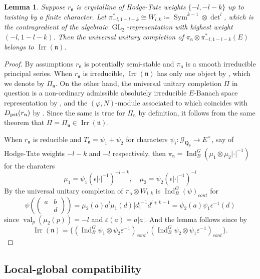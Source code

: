 \documentclass[leqno]{amsart}
\newtheorem{lem}[thm]{Lemma}
\theoremstyle{definition}
\theoremstyle{remark}
\newcommand{\Qp}{\mathbf{Q}_p}
\DeclareMathOperator{\Ind}{Ind}
\DeclareMathOperator{\Sym}{Sym}
\DeclareMathOperator{\GL}{GL}
\DeclareMathOperator{\val}{val} %
\newcommand{\pst}{\textnormal{pst}}
\newcommand{\fn}{\mathfrak{n}}
\DeclareMathOperator{\Irr}{Irr}
\newcommand{\Gp}{\mathcal{G}_{\Qp}} %
\begin{document}
\begin{lem}\label{lem:uni_completion}
	Suppose $r_\fn$ is crystalline of
	Hodge-Tate weights $\{-l,-l-k\}$
    up to twisting by a finite character.
    Let $\pi_{-l,1-l-k}^*\cong W_{l,k}\coloneqq
    \Sym^{k-1}\otimes\det^l$, which is the contragredient of
    the algebraic $\GL_2$-representation
    with highest weight $(-l,1-l-k)$.
	Then the universal unitary completion of 
	$\pi_\fn\otimes \pi_{-l,1-l-k}^*(E)$ belongs to 
	$\Irr(\fn)$.
\end{lem}
\begin{proof}
    By assumptions $r_{\fn}$ is potentially semi-stable and
    $\pi_{\fn}$ is a smooth irreducible principal series.
    When $r_\fn$ is irreducible, $\Irr(\fn)$
    has only one object by \cite[Cor 8.14]{pask},
    which we denote by $\Pi_{\fn}$.
    On the other hand,
    the universal unitary completion $\Pi$ in question
    is a non-ordinary admissible absolutely 
    irreducible $E$-Banach space representation
    by \cite[Thm 12.3]{pask},
    and the $(\varphi,N)$-module
    associated to which
    coincides with $D_{\pst}(r_\fn)$
    by \cite[Thm. 1.3]{CDP}.
    Since the same is true for $\Pi_{\fn}$
    by definition,
    it follows from the same theorem
    that $\Pi=\Pi_{\fn}\in \Irr(\fn)$.

	When  $r_\fn$ is reducible
	and $T_\fn=\psi_1+\psi_2$
	for characters
	$\psi_i\colon \Gp\to E^\times$,
	say of Hodge-Tate weights
	$-l-k$ and  $-l$ respectively,
	then $\pi_\fn=\Ind_B^G(\mu_1\otimes\mu_2|\cdot|^{-1})$
	for the charaters
	\[
	\mu_1=\psi_1(\epsilon|\cdot|^{-1})^{-l-k},\quad
	\mu_2=\psi_2(\epsilon|\cdot|^{-1})^{-l}	
	\]
	By \cite[Thm 12.3]{pask} the universal unitary completion
	of $\pi_\fn\otimes W_{l,k}$
	is $\Ind_B^G(\psi)_{cont}$ for
	\[
		\psi( (\begin{smallmatrix}
			a&b\\&d
		\end{smallmatrix}))
		=\mu_2(a)a^l\mu_1(d)|d|^{-1}d^{l+k-1}
		=\psi_2(a)\psi_1\epsilon^{-1}(d)
	\]
	since $\val_p(\mu_2(p))=-l$ and $\varepsilon(a)=a|a|$.
    And the lemma follows since
	by \cite[Cor 8.15]{pask}
	\[
	\Irr(\fn)=\{(\Ind_B^G\psi_1\otimes\psi_2\varepsilon^{-1})_{cont},
	(\Ind_B^G\psi_2\otimes\psi_1\varepsilon^{-1})_{cont}\}.
	\]
\end{proof}

\subsection{Local-global compatibility}
\label{sub:compatible}
\end{document}
